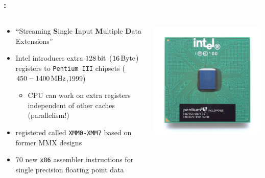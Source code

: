 \documentclass[9pt,xcolor=table]{beamer}
\begin{document}
\begin{frame}
\frametitle{\insertsectionhead{}: \insertsubsectionhead{}}
\begin{columns}[c]
  \begin{column}{.68\textwidth}
      \begin{itemize}
      \item ``Streaming \textbf{S}ingle \textbf{I}nput \textbf{M}ultiple \textbf{D}ata Extensions''
      \item Intel introduces extra $\unit[128]{bit}$ ($\unit[16]{Byte}$) registers to \texttt{Pentium III} chipsets ($\unit[450-1400]{MHz}$,1999)
        \begin{itemize}
        \item CPU can work on extra registers independent of other caches (parallelism!)
        \end{itemize}
      \item registered called \texttt{XMM0-XMM7} based on former MMX designs
      \item $70$ new \texttt{x86} assembler instructions for single precision floating point data
      \end{itemize}
  \end{column}
  \begin{column}{.27\textwidth}
    \vfill
    \includegraphics[width=.9\textwidth]{img/KL_Intel_Pentium_III_Coppermine_small}
    \vfill

\end{column}
\end{columns}
\end{frame}
\end{document}
